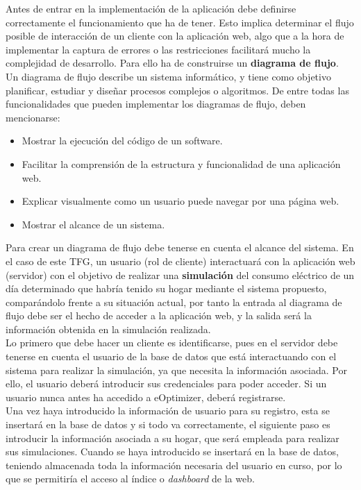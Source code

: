 Antes de entrar en la implementación de la aplicación debe definirse correctamente el funcionamiento que ha de tener. Esto implica determinar el flujo posible de interacción de un cliente con la aplicación web, algo que a la hora de implementar la captura de errores o las restricciones facilitará mucho la complejidad de desarrollo. Para ello ha de construirse un \textbf{diagrama de flujo}.\\

Un diagrama de flujo describe un sistema informático, y tiene como objetivo planificar, estudiar y diseñar procesos complejos o algoritmos. De entre todas las funcionalidades que pueden implementar los diagramas de flujo, deben mencionarse:
\begin{itemize}
\item Mostrar la ejecución del código de un software.
\item Facilitar la comprensión de la estructura y funcionalidad de una aplicación web.
\item Explicar visualmente como un usuario puede navegar por una página web.
\item Mostrar el alcance de un sistema.
\end{itemize}
Para crear un diagrama de flujo debe tenerse en cuenta el alcance del sistema. En el caso de este \gls{TFG}, un usuario (rol de cliente) interactuará con la aplicación web (servidor) con el objetivo de realizar una \textbf{simulación} del consumo eléctrico de un día determinado que habría tenido su hogar mediante el sistema propuesto, comparándolo frente a su situación actual, por tanto la entrada al diagrama de flujo debe ser el hecho de acceder a la aplicación web, y la salida será la información obtenida en la simulación realizada.\\

Lo primero que debe hacer un cliente es identificarse, pues en el servidor debe tenerse en cuenta el usuario de la base de datos que está interactuando con el sistema para realizar la simulación, ya que necesita la información asociada. Por ello, el usuario deberá introducir sus credenciales para poder acceder. Si un usuario nunca antes ha accedido a eOptimizer, deberá registrarse.\\

Una vez haya introducido la información de usuario para su registro, esta se insertará en la base de datos y si todo va correctamente, el siguiente paso es introducir la información asociada a su hogar, que será empleada para realizar sus simulaciones. Cuando se haya introducido se insertará en la base de datos, teniendo almacenada toda la información necesaria del usuario en curso, por lo que se permitiría el acceso al índice o \textit{dashboard} de la web.\\

